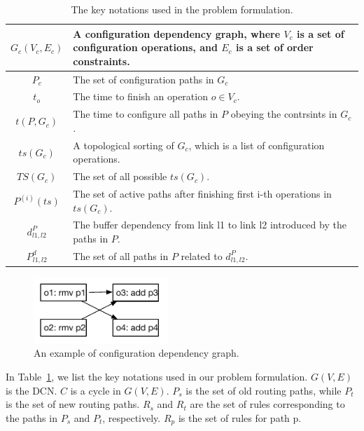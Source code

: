 \begin{table}
\begin{tabularx}{0.48\textwidth}{ |c||X| }
	$G_c(V_c,E_c)$ & A configuration dependency graph, where $V_c$ is a set of configuration operations, and $E_c$ is a set of order constraints.\\
	\hline
	$P_c$ & The set of configuration paths in $G_c$\\
	\hline
	$t_o$ & The time to finish an operation $ o \in V_c$.\\
	\hline
	$t(P, G_c)$&The time to configure all paths in $P$ obeying the contrsints in $G_c$.\\
	\hline
	$ts(G_c)$ & A topological sorting of $G_c$, which is a list of configuration operations. \\ 
	\hline
	$TS(G_c)$ & The set of all possible $ts(G_c)$. \\
	\hline
	$P^{(i)}(ts)$& The set of active paths after finishing first i-th operations in $ts(G_c)$.\\
	\hline
	$d_{l1,l2}^P$ & The buffer dependency from link l1 to link l2 introduced by the paths in $P$.\\
	\hline
	$P^d_{l1,l2}$ & The set of all paths in $P$ related to  $d_{l1,l2}^P$.\\
	\hline
\end{tabularx}
\caption{The key notations used in the problem formulation.}\label{table:formulation}
\end{table}


\begin{figure}[t]
	\centering
		\includegraphics[width=0.45\textwidth] {figs/formulation_example}
	\caption{An example of configuration dependency graph.}\label{fig:cdgraph}
	
\end{figure}

In Table~\ref{table:formulation}, we list the key notations used in our problem formulation. $G(V,E)$ is the DCN. $C$ is a cycle in $G(V,E)$.  $P_s$ is the set of old routing paths, while $P_t$ is the set of new routing paths. $R_s$ and $R_t$ are the set of rules corresponding to the paths in $P_s$ and $P_t$, respectively.  $R_p$ is the set of rules for path p. 

